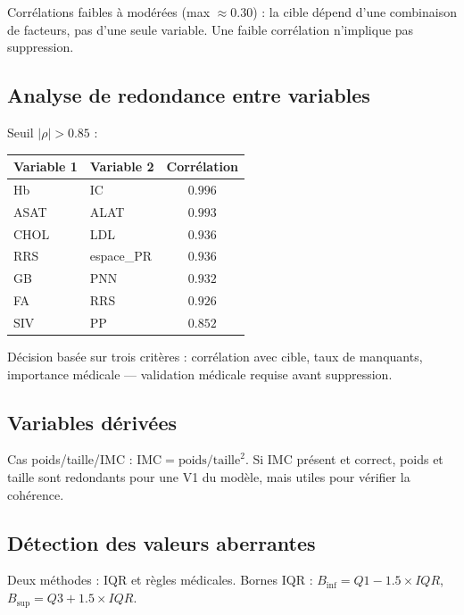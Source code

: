 \documentclass[12pt,a4paper]{report}
\begin{document}
Corrélations faibles à modérées (max $\approx 0.30$) : la cible dépend d'une combinaison
de facteurs, pas d'une seule variable. Une faible corrélation n'implique pas suppression.

\subsection{Analyse de redondance entre variables}

Seuil $|\rho|>0.85$ :

\begin{center}
\renewcommand{\arraystretch}{1.2}
\begin{tabular}{@{}l l c@{}}
\toprule
\textbf{Variable 1} & \textbf{Variable 2} & \textbf{Corrélation} \\
\midrule
Hb & IC & $0.996$ \\
ASAT & ALAT & $0.993$ \\
CHOL & LDL & $0.936$ \\
RRS & espace\_PR & $0.936$ \\
GB & PNN & $0.932$ \\
FA & RRS & $0.926$ \\
SIV & PP & $0.852$ \\
\bottomrule
\end{tabular}
\end{center}

Décision basée sur trois critères : corrélation avec cible, taux de manquants,
importance médicale — validation médicale requise avant suppression.

\subsection{Variables dérivées}

Cas poids/taille/IMC : $\text{IMC}=\text{poids}/\text{taille}^2$. Si IMC présent et
correct, poids et taille sont redondants pour une V1 du modèle, mais utiles pour
vérifier la cohérence.

\subsection{Détection des valeurs aberrantes}

Deux méthodes : IQR et règles médicales. Bornes IQR :
$B_{\text{inf}}=Q1-1.5\times IQR$, $B_{\text{sup}}=Q3+1.5\times IQR$.
\end{document}
